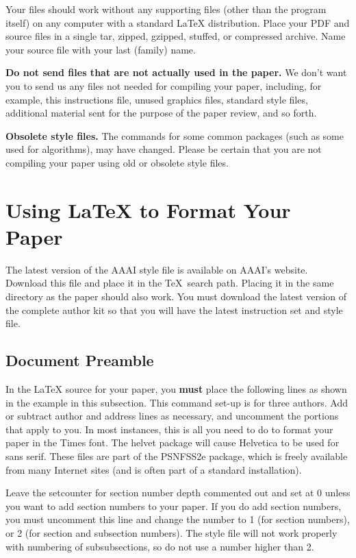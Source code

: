 \documentclass[letterpaper]{article} %
\begin{document}
Your files should work without any supporting files (other than the program itself) on any computer with a standard \LaTeX{} distribution. Place your PDF and source files in a single tar, zipped, gzipped, stuffed, or compressed archive. Name your source file with your last (family) name.

\textbf{Do not send files that are not actually used in the paper.} We don't want you to send us any files not needed for compiling your paper, including, for example, this instructions file, unused graphics files, standard style files, additional material sent for the purpose of the paper review, and so forth.

\textbf{Obsolete style files.}  The commands for some common packages (such as some used for algorithms), may have changed. Please be certain that you are not compiling your paper using old or obsolete style files. 

\section{Using \LaTeX{} to Format Your Paper}

The latest version of the AAAI style file is available on AAAI's website. Download this file and place it in  the \TeX\ search path. Placing it in the same directory as the paper should also work. You must download the latest version of the complete author kit so that you will have the latest instruction set and style file.

\subsection{Document Preamble}

In the \LaTeX{} source for your paper, you \textbf{must} place the following lines as shown in the example in this subsection. This command set-up is for three authors. Add or subtract author and address lines as necessary, and uncomment the portions that apply to you. In most instances, this is all you need to do to format your paper in the Times font. The helvet package will cause Helvetica to be used for sans serif. These files are part of the PSNFSS2e package, which is freely available from many Internet sites (and is often part of a standard installation).

Leave the setcounter for section number depth commented out and set at 0 unless you want to add section numbers to your paper. If you do add section numbers, you must uncomment this line and change the number to 1 (for section numbers), or 2 (for section and subsection numbers). The style file will not work properly with numbering of subsubsections, so do not use a number higher than 2.
\end{document}
